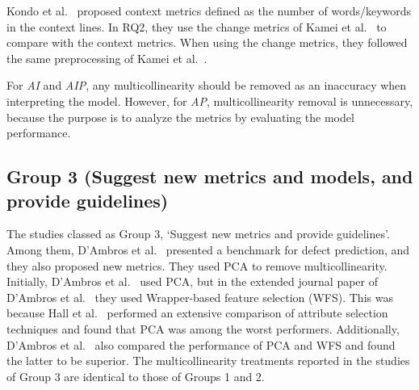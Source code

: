 Kondo et al.~\cite{Kondo2020EMSEContext} proposed context metrics defined as the number of words/keywords in the context lines. 
In RQ2, they use the change metrics of Kamei et al.~\cite{Kamei2013TSEjit} to compare with the context metrics.
When using the change metrics, they followed the same preprocessing of Kamei et al.~\cite{Kamei2013TSEjit}.

For \textit{AI} and \textit{AIP}, any multicollinearity should be removed as an inaccuracy when interpreting the model. However, for \textit{AP}, multicollinearity removal is unnecessary, because the purpose is to analyze the metrics by evaluating the model performance.


\subsection{Group 3 (Suggest new metrics and models, and provide guidelines)} 
The studies classed as Group 3, `Suggest new metrics and provide guidelines'. 
Among them, D'Ambros et al.~\cite{Ambros2010MSRExtensiveComparison} presented a benchmark for defect prediction, and they also proposed new metrics. They used PCA to remove multicollinearity.
Initially, D'Ambros et al.~\cite{Ambros2010MSRExtensiveComparison} used PCA, but in the extended journal paper of D'Ambros et al.~\cite{DAmbros2012EMSEbenchmark} they used Wrapper-based feature selection (WFS).
This was because Hall et al.~\cite{Hall2003TKDEfeatureselection} performed an extensive comparison of attribute selection techniques and found that PCA was among the worst performers. Additionally, D'Ambros et al.~\cite{DAmbros2012EMSEbenchmark} also compared the performance of PCA and WFS and found the latter to be superior.
The multicollinearity treatments reported in the studies of Group 3 are identical to those of Groups 1 and 2.

